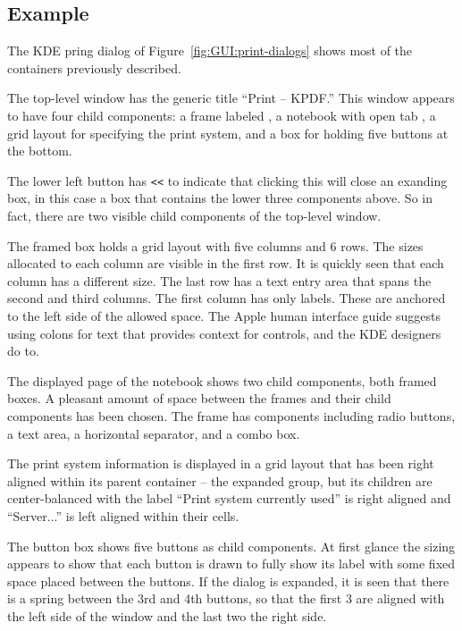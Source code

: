 \subsection{Example}

The KDE pring dialog of Figure~\ref{fig:GUI:print-dialogs} shows
most of the containers previously described. 

The top-level window has the generic title ``Print -- KPDF.'' This
window appears to have four child components: a frame labeled
, a notebook with open tab , a
grid layout for specifying the print system, and a box for holding
five buttons at the bottom. 

The lower left  button has \verb+<<+ to
indicate that clicking this will close an exanding box, in this case a
box that contains the lower three components above. So in fact, there
are two visible child components of the top-level window.

The framed box holds a grid layout with five columns and 6 rows. The
sizes allocated to each column are visible in the first row. It is
quickly seen that each column has a different size. The last row has a
text entry area that spans the second and third columns. The first
column has only labels. These are anchored to the left side of the
allowed space. The Apple human interface guide
\citep{APPLE:HIG} suggests using colons for text that provides
context for controls, and the KDE designers do to. 

The displayed page of the notebook shows two child components, both
framed boxes. A pleasant amount of space between the frames and their
child components has been chosen. The  frame has
components including radio buttons, a text area, a horizontal
separator, and a combo box.

The print system information is displayed in a grid layout that has
been right aligned within its parent container -- the expanded group,
but its children are center-balanced with the label ``Print system
currently used'' is right aligned and ``Server...'' is left aligned
within their cells.

The button box shows five buttons as child components. At first glance
the sizing appears to show that each button is drawn to fully show its label
with some fixed space placed between the buttons. If the dialog is
expanded, it is seen that there is a spring between the 3rd and 4th
buttons, so that the first 3 are aligned with the left side of the
window and the last two the right side.

